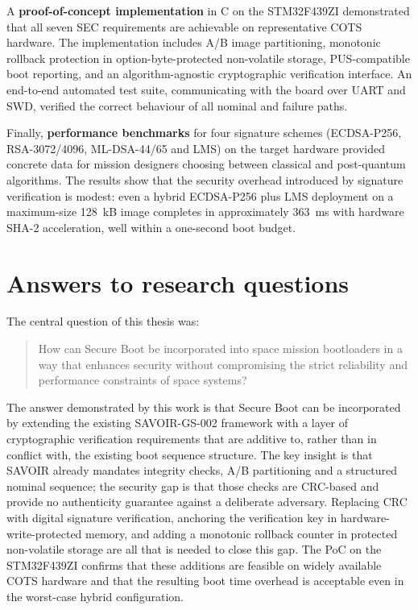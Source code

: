 A \textbf{proof-of-concept implementation} in C on the STM32F439ZI demonstrated that all seven SEC requirements are achievable on representative COTS hardware. The implementation includes A/B image partitioning, monotonic rollback protection in option-byte-protected non-volatile storage, PUS-compatible boot reporting, and an algorithm-agnostic cryptographic verification interface. An end-to-end automated test suite, communicating with the board over UART and SWD, verified the correct behaviour of all nominal and failure paths.

Finally, \textbf{performance benchmarks} for four signature schemes (ECDSA-P256, RSA-3072/4096, ML-DSA-44/65 and LMS) on the target hardware provided concrete data for mission designers choosing between classical and post-quantum algorithms. The results show that the security overhead introduced by signature verification is modest: even a hybrid ECDSA-P256 plus LMS deployment on a maximum-size 128~kB image completes in approximately 363~ms with hardware SHA-2 acceleration, well within a one-second boot budget.


\section{Answers to research questions}
\label{section:conclusion-RQs}

The central question of this thesis was:

\begin{quote}
How can Secure Boot be incorporated into space mission bootloaders in a way that enhances security without compromising the strict reliability and performance constraints of space systems?
\end{quote}

The answer demonstrated by this work is that Secure Boot can be incorporated by extending the existing SAVOIR-GS-002 framework with a layer of cryptographic verification requirements that are additive to, rather than in conflict with, the existing boot sequence structure. The key insight is that SAVOIR already mandates integrity checks, A/B partitioning and a structured nominal sequence; the security gap is that those checks are CRC-based and provide no authenticity guarantee against a deliberate adversary. Replacing CRC with digital signature verification, anchoring the verification key in hardware-write-protected memory, and adding a monotonic rollback counter in protected non-volatile storage are all that is needed to close this gap. The PoC on the STM32F439ZI confirms that these additions are feasible on widely available COTS hardware and that the resulting boot time overhead is acceptable even in the worst-case hybrid configuration.

